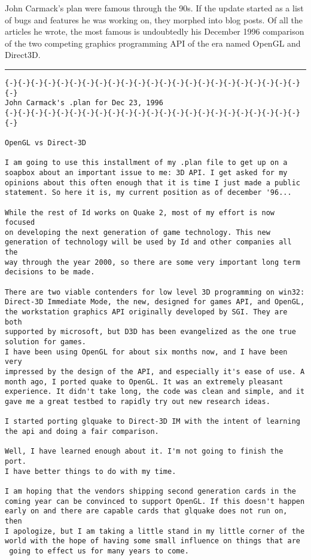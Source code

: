 John Carmack's plan were famous through the 90s. If the update started as a list of bugs and features he was working
on, they morphed into blog posts. Of all the articles he wrote, the most famous is undoubtedly his December 1996 comparison of the two competing graphics programming API of the era named OpenGL and Direct3D.\\
\par
\label{openglvsdirectd}
\hrule  \bigskip
\begin{verbatim}
{-}{-}{-}{-}{-}{-}{-}{-}{-}{-}{-}{-}{-}{-}{-}{-}{-}{-}{-}{-}{-}{-}{-}{-}
John Carmack's .plan for Dec 23, 1996
{-}{-}{-}{-}{-}{-}{-}{-}{-}{-}{-}{-}{-}{-}{-}{-}{-}{-}{-}{-}{-}{-}{-}{-}

OpenGL vs Direct-3D

I am going to use this installment of my .plan file to get up on a 
soapbox about an important issue to me: 3D API. I get asked for my 
opinions about this often enough that it is time I just made a public 
statement. So here it is, my current position as of december '96... 

While the rest of Id works on Quake 2, most of my effort is now focused 
on developing the next generation of game technology. This new 
generation of technology will be used by Id and other companies all the 
way through the year 2000, so there are some very important long term 
decisions to be made.

There are two viable contenders for low level 3D programming on win32: 
Direct-3D Immediate Mode, the new, designed for games API, and OpenGL, 
the workstation graphics API originally developed by SGI. They are both 
supported by microsoft, but D3D has been evangelized as the one true 
solution for games. 
I have been using OpenGL for about six months now, and I have been very 
impressed by the design of the API, and especially it's ease of use. A 
month ago, I ported quake to OpenGL. It was an extremely pleasant 
experience. It didn't take long, the code was clean and simple, and it 
gave me a great testbed to rapidly try out new research ideas. 

I started porting glquake to Direct-3D IM with the intent of learning 
the api and doing a fair comparison. 

Well, I have learned enough about it. I'm not going to finish the port. 
I have better things to do with my time. 

I am hoping that the vendors shipping second generation cards in the 
coming year can be convinced to support OpenGL. If this doesn't happen 
early on and there are capable cards that glquake does not run on, then 
I apologize, but I am taking a little stand in my little corner of the 
world with the hope of having some small influence on things that are 
 going to effect us for many years to come. 


\end{verbatim}
